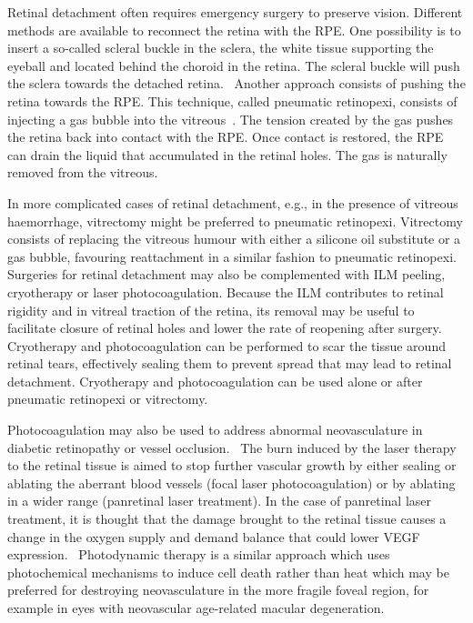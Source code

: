 \documentclass[12pt,a4paper]{journal}
\begin{document}
Retinal detachment often requires emergency surgery to preserve vision.
Different methods are available to reconnect the retina with the RPE.
One possibility is to insert a so-called scleral buckle in the sclera, the white tissue supporting the eyeball and located behind the choroid in the retina.
The scleral buckle will push the sclera towards the detached retina.~\cite{Sodhi_2008}
Another approach consists of pushing the retina towards the RPE.
This technique, called pneumatic retinopexi, consists of injecting a gas bubble into the vitreous~\cite{Sodhi_2008}.
The tension created by the gas pushes the retina back into contact with the RPE.
Once contact is restored, the RPE can drain the liquid that accumulated in the retinal holes.
The gas is naturally removed from the vitreous.

In more complicated cases of retinal detachment, e.g., in the presence of vitreous haemorrhage, vitrectomy might be preferred to pneumatic retinopexi.
Vitrectomy consists of replacing the vitreous humour with either a silicone oil substitute or a gas bubble, favouring reattachment in a similar fashion to pneumatic retinopexi.~\cite{Dervenis_2022}
Surgeries for retinal detachment may also be complemented with ILM peeling, cryotherapy or laser photocoagulation.
Because the ILM contributes to retinal rigidity and in vitreal traction of the retina, its removal may be useful to facilitate closure of retinal holes and lower the rate of reopening after surgery.~\cite{Chatziralli_2018}
Cryotherapy and photocoagulation can be performed to scar the tissue around retinal tears, effectively sealing them to prevent spread that may lead to retinal detachment.
Cryotherapy and photocoagulation can be used alone or after pneumatic retinopexi or vitrectomy.~\cite{Sodhi_2008}

Photocoagulation may also be used to address abnormal neovasculature in diabetic retinopathy or vessel occlusion.~\cite{Evans_2014}
The burn induced by the laser therapy to the retinal tissue is aimed to stop further vascular growth by either sealing or ablating the aberrant blood vessels (focal laser photocoagulation) or by ablating in a wider range (panretinal laser treatment).
In the case of panretinal laser treatment, it is thought that the damage brought to the retinal tissue causes a change in the oxygen supply and demand balance that could lower VEGF expression.~\cite{Evans_2014}
Photodynamic therapy is a similar approach which uses photochemical mechanisms to induce cell death rather than heat which may be preferred for destroying neovasculature in the more fragile foveal region, for example in eyes with neovascular age-related macular degeneration.~\cite{SchmidtErfurth_2000}
\end{document}
